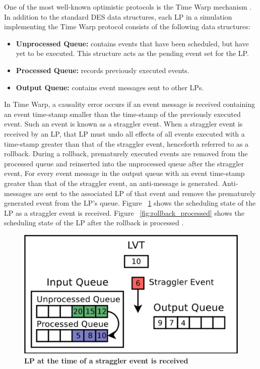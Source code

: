 \documentclass[a4paper]{article}
\let\origitem\item
\renewcommand{\item}{\normalfont\origitem}
\begin{document}
One of the most well-known optimistic protocols is the Time Warp mechanism
\cite{fujimoto}.  In addition to the standard DES data structures, each LP in a
simulation implementing the Time Warp protocol consists of the following data
structures:\par 
\begin{itemize}
\item\textbf{Unprocessed Queue:} contains events that have been scheduled, but have
yet to be executed.  This structure acts as the pending event set for the
LP. 
\item\textbf{Processed Queue:} records previously executed events.
\item\textbf{Output Queue:} contains event messages sent to other LPs.
\end{itemize}

In Time Warp, a causality error occurs if an event message is
received containing an event time-stamp smaller than the time-stamp of the
previously executed event.  Such an event is known as a straggler event.  When a
straggler event is received by an LP, that LP must undo all effects of all
events executed with a time-stamp greater than that of the straggler event,
henceforth referred to as a rollback.  During a rollback, prematurely executed
events are removed from the processed queue and reinserted into the unprocessed
queue after the straggler event,  For every event message in the output queue
with an event time-stamp greater than that of the straggler event, an
anti-message is generated.  Anti-messages are sent to the associated LP of that
event and remove the prematurely generated event from the LP's queue.  Figure
~\ref{fig:rollback_stragglerrecvd} shows the scheduling state of the LP as a
straggler event is received.  Figure ~\ref{fig:rollback_processed} shows the
scheduling state of the LP after the rollback is processed \cite{dickman}.

\begin{figure}[H]
    \centering
    \graphicspath{ {./figures/} }
    \includegraphics[width=\textwidth,height=\textheight,keepaspectratio]{rollback_recv}
    \caption{\textbf{LP at the time of a straggler event is received}}
    \label{fig:rollback_stragglerrecvd}
\end{figure}
\end{document}
